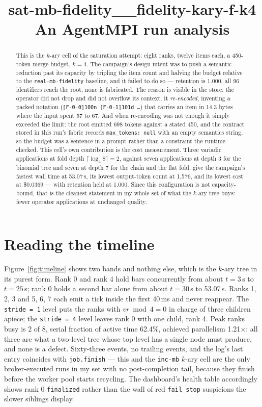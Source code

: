 \documentclass[11pt]{article}
\title{\textbf{sat-mb-fidelity\_\_fidelity-kary-f-k4}\\[2pt]\large An AgentMPI run analysis}
\author{}
\date{}
\begin{document}
\maketitle

\begin{abstract}
This is the $k$-ary cell of the saturation attempt: eight ranks, twelve items each, a
450-token merge budget, $k=4$. The campaign's design intent was to push a semantic
reduction past its capacity by tripling the item count and halving the budget relative to
the \texttt{real-mb-fidelity} baseline, and it failed to do so --- retention is 1.000, all
96 identifiers reach the root, none is fabricated. The reason is visible in the store: the
operator did not drop and did not overflow its context, it \emph{re-encoded}, inventing a
packed notation (\texttt{[F-0-0]100n [F-0-1]101d \dots}) that carries an item in 14.3 bytes
where the input spent 57 to 67. And when re-encoding was not enough it simply exceeded the
limit: the root emitted 698 tokens against a stated 450, and the contract stored in this
run's fabric records \texttt{max\_tokens: null} with an empty semantics string, so the
budget was a sentence in a prompt rather than a constraint the runtime checked. This cell's
own contribution is the cost measurement. Three variadic applications at fold depth
$\lceil\log_4 8\rceil = 2$, against seven applications at depth 3 for the binomial tree and
seven at depth 7 for the chain and the flat fold, give the campaign's fastest wall time at
53.07\,s, its lowest output-token count at 1{,}576, and its lowest cost at \$0.0369 ---
with retention held at 1.000. Since this configuration is not capacity-bound, that is the
cleanest statement in my whole set of what the $k$-ary tree buys: fewer operator
applications at unchanged quality.
\end{abstract}



\section{Reading the timeline}

Figure~\ref{fig:timeline} shows two bands and nothing else, which is the $k$-ary tree in
its purest form. Rank 0 and rank 4 hold bars concurrently from about $t=3$\,s to $t=25$\,s;
rank 0 holds a second bar alone from about $t=30$\,s to 53.07\,s. Ranks 1, 2, 3 and 5, 6, 7
each emit a tick inside the first 40\,ms and never reappear. The \texttt{stride = 1} level
puts the ranks with $vr \bmod 4 = 0$ in charge of three children apiece; the
\texttt{stride = 4} level leaves rank 0 with one child, rank 4. Peak ranks busy is 2 of 8,
serial fraction of active time 62.4\%, achieved parallelism 1.21$\times$: all three are
what a two-level tree whose top level has a single node must produce, and none is a defect.
Sixty-three events, no trailing events, and the log's last entry coincides with
\texttt{job.finish} --- this and the \texttt{inc-mb} $k$-ary cell are the only
broker-executed runs in my set with no post-completion tail, because they finish before the
worker pool starts recycling. The dashboard's health table accordingly shows rank 0
\texttt{finalized} rather than the wall of red \texttt{fail\_stop} suspicions the slower
siblings display.
\end{document}
